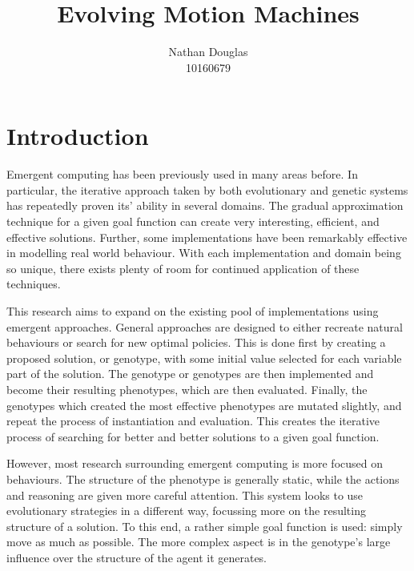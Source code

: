 \documentclass[runningheads]{llncs}
\begin{document}
\title{Evolving Motion Machines}

\author{Nathan Douglas\\10160679}



\maketitle



\section{Introduction}
\label{sec:Introduction}
Emergent computing has been previously used in many areas before.
In particular, the iterative approach taken by both evolutionary and genetic systems has repeatedly proven its' ability in several domains.
The gradual approximation technique for a given goal function can create very interesting, efficient, and effective solutions.
Further, some implementations have been remarkably effective in modelling real world behaviour.
With each implementation and domain being so unique, there exists plenty of room for continued application of these techniques.

This research aims to expand on the existing pool of implementations using emergent approaches.
General approaches are designed to either recreate natural behaviours or search for new optimal policies.
This is done first by creating a proposed solution, or genotype, with some initial value selected for each variable part of the solution.
The genotype or genotypes are then implemented and become their resulting phenotypes, which are then evaluated.
Finally, the genotypes which created the most effective phenotypes are mutated slightly, and repeat the process of instantiation and evaluation.
This creates the iterative process of searching for better and better solutions to a given goal function.

However, most research surrounding emergent computing is more focused on behaviours.
The structure of the phenotype is generally static, while the actions and reasoning are given more careful attention.
This system looks to use evolutionary strategies in a different way, focussing more on the resulting structure of a solution.
To this end, a rather simple goal function is used: simply move as much as possible.
The more complex aspect is in the genotype's large influence over the structure of the agent it generates.
\end{document}

